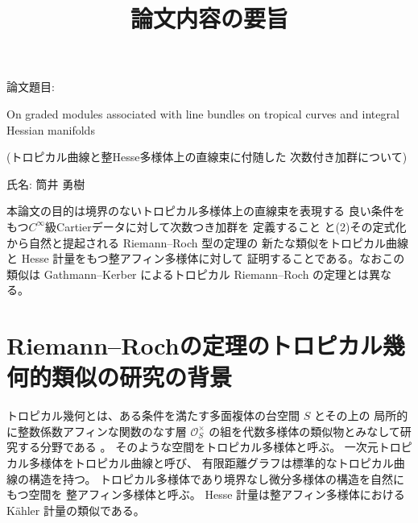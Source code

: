 \documentclass[uplatex,dvipdfmx,12pt]{jsarticle}
\title{論文内容の要旨
}
\date{}
\numberwithin{equation}{section}
\theoremstyle{definition}
\newcommand{\beforesection}{\vspace{-15pt}}
\newcommand{\aftersection}{\vspace{-8pt}}
\begin{document}
\setlength{\baselineskip}{-5pt}
\setlength{\parskip}{2pt}

\linenumbers

\maketitle
{\large
\noindent
論文題目:

On graded modules associated with line bundles on 
tropical curves and integral Hessian manifolds

(トロピカル曲線と整Hesse多様体上の直線束に付随した
次数付き加群について)
}

\vspace{5pt}

\noindent
{\large
氏名: 筒井 勇樹
}

\vspace{10pt}

\setlength{\baselineskip}{4pt}
\setlength{\parskip}{2pt}

本論文の目的は境界のないトロピカル多様体上の直線束を表現する
良い条件をもつ$C^{\infty}$級Cartierデータに対して次数つき加群を
定義すること
と(2)その定式化から自然と提起される Riemann--Roch 型の定理の
新たな類似をトロピカル曲線と Hesse 計量をもつ整アフィン多様体に対して
証明することである。なおこの類似は Gathmann--Kerber
によるトロピカル Riemann--Roch の定理とは異なる。

\beforesection

\section{Riemann--Rochの定理のトロピカル幾何的類似の研究の背景}

\aftersection

トロピカル幾何とは、ある条件を満たす多面複体の台空間 $S$ とその上の
局所的に整数係数アフィンな関数のなす層 
$\mathcal{O}_S^{\times}$
の組を代数多様体の類似物とみなして研究する分野である
\cite{mikhalkinTropicalEigenwaveIntermediate2014a,
gross2019sheaftheoretic}。
そのような空間をトロピカル多様体と呼ぶ。
一次元トロピカル多様体をトロピカル曲線と呼び、
有限距離グラフは標準的なトロピカル曲線の構造を持つ。
トロピカル多様体であり境界なし微分多様体の構造を自然にもつ空間を
整アフィン多様体と呼ぶ。
Hesse 計量は整アフィン多様体における
K\"ahler 計量の類似である。
\end{document}
